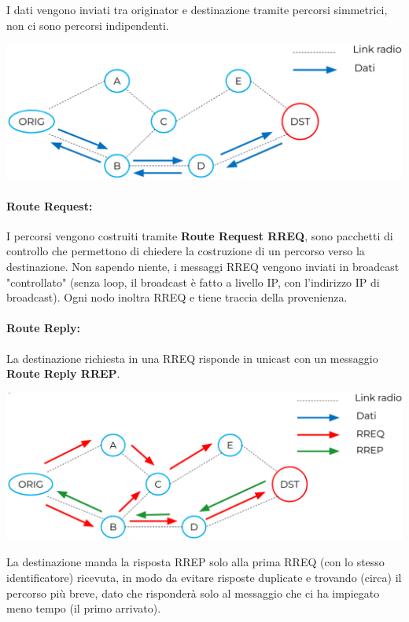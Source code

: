 \newpage

I dati vengono inviati tra originator e destinazione tramite percorsi simmetrici, non ci sono percorsi indipendenti.
\begin{center}
	\includegraphics[width=0.9\linewidth]{img/aodv/path1}
\end{center}

\paragraph{Route Request:} I percorsi vengono costruiti tramite \textbf{Route Request RREQ}, sono pacchetti di controllo che permettono di chiedere la costruzione di un percorso verso la destinazione. Non sapendo niente, i messaggi RREQ vengono inviati in broadcast "controllato" (senza loop, il broadcast è fatto a livello IP, con l'indirizzo IP di broadcast). Ogni nodo inoltra RREQ e tiene traccia della provenienza.\\

\paragraph{Route Reply:} La destinazione richiesta in una RREQ risponde in unicast con un messaggio \textbf{Route Reply RREP}.
\begin{center}
	\includegraphics[width=0.9\linewidth]{img/aodv/path2}
\end{center}

La destinazione manda la risposta RREP solo alla prima RREQ (con lo stesso identificatore) ricevuta, in modo da evitare risposte duplicate e trovando (circa) il percorso più breve, dato che risponderà solo al messaggio che ci ha impiegato meno tempo (il primo arrivato).\\

